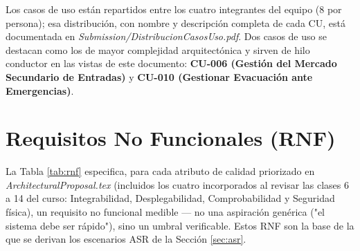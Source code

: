 \documentclass[11pt,a4paper]{article}
\begin{document}
Los casos de uso están repartidos entre los cuatro integrantes del equipo (8 por persona); esa
distribución, con nombre y descripción completa de cada CU, está documentada en
\textit{Submission/DistribucionCasosUso.pdf}. Dos casos de uso se destacan como los de mayor
complejidad arquitectónica y sirven de hilo conductor en las vistas de este documento:
\textbf{CU-006 (Gestión del Mercado Secundario de Entradas)} y \textbf{CU-010 (Gestionar
Evacuación ante Emergencias)}.

\section{Requisitos No Funcionales (RNF)}
\label{sec:rnf}

La Tabla \ref{tab:rnf} especifica, para cada atributo de calidad priorizado en
\textit{ArchitecturalProposal.tex} (incluidos los cuatro incorporados al revisar las clases 6 a 14
del curso: Integrabilidad, Desplegabilidad, Comprobabilidad y Seguridad física), un requisito no
funcional medible — no una aspiración genérica ("el sistema debe ser rápido"), sino un umbral
verificable. Estos RNF son la base de la que se derivan los escenarios ASR de la Sección
\ref{sec:asr}.
\end{document}
